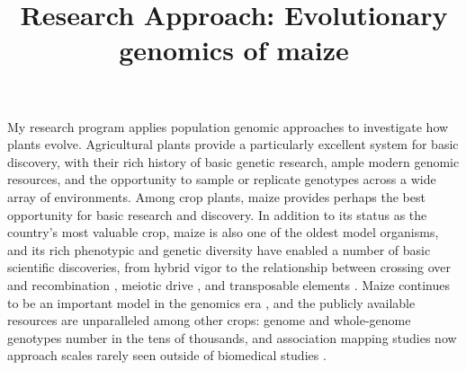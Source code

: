 \documentclass[11pt,letterpaper]{article}
\begin{document}
\title{\vspace{-5ex}Research Approach: Evolutionary genomics of maize\vspace{-4ex}}
\author{}
\date{}
\maketitle




My research program applies population genomic approaches to investigate how plants evolve.
Agricultural plants provide a particularly excellent system for basic discovery, with their rich history of basic genetic research, ample modern genomic resources, and the opportunity to sample or replicate genotypes across a wide array of environments.
Among crop plants, maize provides perhaps the best opportunity for basic research and discovery.
In addition to its status as the country's most valuable crop, maize is also one of the oldest model organisms, and its rich phenotypic and genetic diversity have enabled a number of basic scientific discoveries, from hybrid vigor \citep{shull1908composition} to the relationship between crossing over and recombination \citep{creighton1931correlation}, meiotic drive \citep{rhoades1942preferential}, and transposable elements \citep{mcclintock1950origin}. 
Maize continues to be an important model in the genomics era \citep{nannas2015genetic}, and the publicly available resources are unparalleled among other crops: genome and whole-genome genotypes number in the tens of thousands, and association mapping studies now approach scales rarely seen outside of biomedical studies \citep[e.g.][]{buckler2009genetic,peiffer2014genetic,Romay2013,Hearne2015}.
\end{document}
